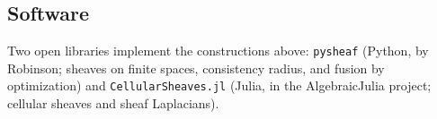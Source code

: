 \documentclass[11pt,a4paper,oneside]{scrartcl}
\theoremstyle{guideplain}
\theoremstyle{guidedef}
\begin{document}
\subsection{Software}
Two open libraries implement the constructions above: \texttt{pysheaf} (Python, by Robinson; sheaves
on finite spaces, consistency radius, and fusion by optimization) and \texttt{CellularSheaves.jl}
(Julia, in the AlgebraicJulia project; cellular sheaves and sheaf Laplacians).

\printbibliography[heading=bibintoc,title={References}]
\end{document}
